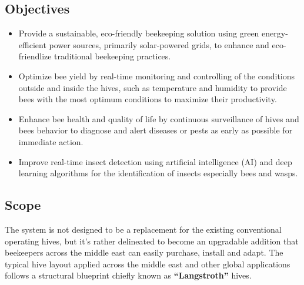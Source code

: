 \documentclass[12pt]{article}
\begin{document}
	\subsection{Objectives}
	
	\begin{itemize}
		\item Provide a sustainable, eco-friendly beekeeping solution using green energy-efficient power sources, primarily solar-powered grids, to enhance and eco-friendlize traditional beekeeping practices.
		
		\item Optimize bee yield by real-time monitoring and controlling of the conditions outside and inside the hives, such as temperature and humidity to provide bees with the most optimum conditions to maximize their productivity.
		
		\item Enhance bee health and quality of life by continuous surveillance of hives and bees behavior to diagnose and alert diseases or pests as early as possible for immediate action.
		
		\item Improve real-time insect detection using artificial intelligence (AI) and deep learning algorithms for the identification of insects especially bees and wasps.
		\vspace{1 cm}
	\end{itemize}
	\subsection{Scope}
	The system is not designed to be a replacement for the existing conventional operating hives, but it’s rather delineated to become an upgradable addition that beekeepers across the middle east can easily purchase, install and adapt.
	The typical hive layout applied across the middle east and other global applications follows a structural blueprint chiefly known as \textbf{“Langstroth”} hives. 
	\begin{table}[H]
		\vspace{1 cm}
		\centering
		\caption{Langstroth 10-frame box dimensions \cite{wood2024langstroth}}
		\vspace{0.25 cm}
		\label{tab:LANGSTROTH_DIMENSIONS}
	\end{table}
	
\end{document}
